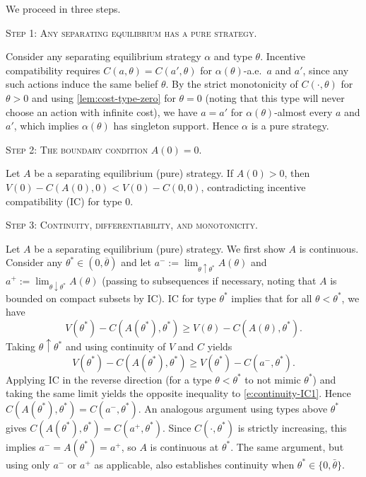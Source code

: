 \documentclass[12 pt]{article}
\makeatletter
\newenvironment{proof}[1][Proof]{\noindent\textbf{#1} }{\ \rule{0.5em}{0.5em}}
\theoremstyle{remark}
\theoremstyle{definition}
\def\typemin{0}
\def\typemax{\overline \theta}
\renewenvironment{proof}[1][\proofname] {\par\pushQED{\qed}\normalfont\topsep6\p@\@plus6\p@\relax\trivlist\item[\hskip\labelsep\bfseries#1\@addpunct{.}]\ignorespaces}{\popQED\endtrivlist\@endpefalse}
\makeatother
\begin{document}
\begin{proof}[Proof of \autoref{prop:separating-differentiable}]
We proceed in three steps.

\medskip
\noindent\textsc{Step 1: Any separating equilibrium has a pure strategy.}

Consider any separating equilibrium strategy $\alpha$ and type $\theta$. Incentive compatibility requires  $C(a, \theta) = C(a', \theta)$ for $\alpha(\theta)$-a.e.~$a$ and $a'$, since any such actions induce the same belief $\theta$. By the strict monotonicity of $C(\cdot,\theta)$ for $\theta>0$ and using \autoref{lem:cost-type-zero} for $\theta=0$ (noting that this type will never choose an action with infinite cost), we have $a = a'$ for $\alpha(\theta)$-almost every $a$ and $a'$, which implies $\alpha(\theta)$ has singleton support. Hence $\alpha$ is a pure strategy.

\medskip
\noindent\textsc{Step 2: The boundary condition $A(0) = 0$.}

Let $A$ be a separating equilibrium (pure) strategy. If $A(\typemin)>0$, then $V(\typemin)-C(A(\typemin),\typemin)<V(\typemin)-C(0,\typemin)$, contradicting incentive compatibility (IC) for type $\typemin$.

\medskip
\noindent\textsc{Step 3: Continuity, differentiability, and monotonicity.}

Let $A$ be a separating equilibrium (pure) strategy. We first show $A$ is continuous. Consider any $\theta^*\in (0,\typemax)$ and let $a^- := \lim_{\theta \uparrow \theta^*} A(\theta)$ and $a^+ := \lim_{\theta \downarrow \theta^*} A(\theta)$ (passing to subsequences if necessary, noting that $A$ is bounded on compact subsets by IC). IC for type $\theta^*$ implies that for all $\theta<\theta^*$, we have
\[
V(\theta^*) - C(A(\theta^*), \theta^*) \geq V(\theta) - C(A(\theta), \theta^*).
\]
Taking $\theta \uparrow \theta^*$ and using continuity of $V$ and $C$ yields
\begin{equation}
\label{e:continuity-IC1}
V(\theta^*) - C(A(\theta^*), \theta^*) \geq V(\theta^*) - C(a^-, \theta^*).    
\end{equation}
Applying IC in the reverse direction (for a type $\theta<\theta^*$ to not mimic $\theta^*$) and taking the same limit yields the opposite inequality to \eqref{e:continuity-IC1}. Hence $C(A(\theta^*), \theta^*) = C(a^-, \theta^*)$. An analogous argument using types above $\theta^*$ gives $C(A(\theta^*), \theta^*) = C(a^+, \theta^*)$. Since $C(\cdot, \theta^*)$ is strictly increasing, this implies $a^- = A(\theta^*) = a^+$, so $A$ is continuous at $\theta^*$. The same argument, but using only $a^-$ or $a^+$ as applicable, also establishes continuity when $\theta^*\in \{\typemin,\bar \theta\}$.



\end{proof}
\end{document}

